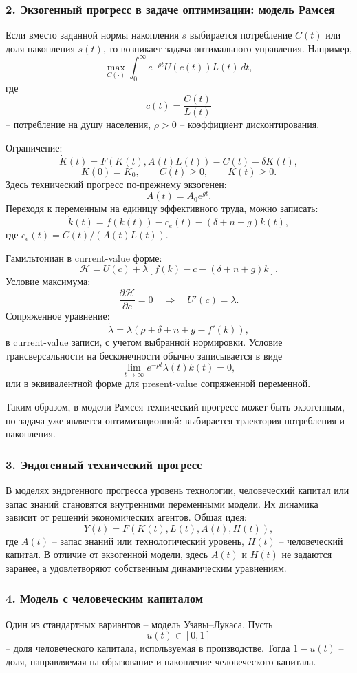 \documentclass[12pt,a4paper]{article}
\begin{document}
\subsubsection*{2. Экзогенный прогресс в задаче оптимизации: модель Рамсея}
Если вместо заданной нормы накопления $s$ выбирается потребление $C(t)$ или доля накопления $s(t)$, то возникает задача оптимального управления. Например,
\[
\max_{C(\cdot)}\int_0^\infty e^{-\rho t}U(c(t))L(t)\,dt,
\]
где
\[
c(t)=\frac{C(t)}{L(t)}
\]
-- потребление на душу населения, $\rho>0$ -- коэффициент дисконтирования.

Ограничение:
\[
\dot K(t)=F(K(t),A(t)L(t))-C(t)-\delta K(t),
\]
\[
K(0)=K_0,\qquad C(t)\ge 0,\qquad K(t)\ge 0.
\]
Здесь технический прогресс по-прежнему экзогенен:
\[
A(t)=A_0e^{gt}.
\]
Переходя к переменным на единицу эффективного труда, можно записать:
\[
\dot k(t)=f(k(t))-c_e(t)-(\delta+n+g)k(t),
\]
где $c_e(t)=C(t)/(A(t)L(t))$.

Гамильтониан в current-value форме:
\[
\mathcal H=U(c)+\lambda\left[f(k)-c-(\delta+n+g)k\right].
\]
Условие максимума:
\[
\frac{\partial \mathcal H}{\partial c}=0
\quad\Longrightarrow\quad
U'(c)=\lambda.
\]
Сопряженное уравнение:
\[
\dot\lambda=\lambda\left(\rho+\delta+n+g-f'(k)\right),
\]
в current-value записи, с учетом выбранной нормировки. Условие трансверсальности на бесконечности обычно записывается в виде
\[
\lim_{t\to\infty}e^{-\rho t}\lambda(t)k(t)=0,
\]
или в эквивалентной форме для present-value сопряженной переменной.

Таким образом, в модели Рамсея технический прогресс может быть экзогенным, но задача уже является оптимизационной: выбирается траектория потребления и накопления.

\subsubsection*{3. Эндогенный технический прогресс}
В моделях эндогенного прогресса уровень технологии, человеческий капитал или запас знаний становятся внутренними переменными модели. Их динамика зависит от решений экономических агентов. Общая идея:
\[
Y(t)=F(K(t),L(t),A(t),H(t)),
\]
где $A(t)$ -- запас знаний или технологический уровень, $H(t)$ -- человеческий капитал. В отличие от экзогенной модели, здесь $A(t)$ и $H(t)$ не задаются заранее, а удовлетворяют собственным динамическим уравнениям.

\subsubsection*{4. Модель с человеческим капиталом}
Один из стандартных вариантов -- модель Узавы--Лукаса. Пусть
\[
u(t)\in[0,1]
\]
-- доля человеческого капитала, используемая в производстве. Тогда $1-u(t)$ -- доля, направляемая на образование и накопление человеческого капитала.
\end{document}
